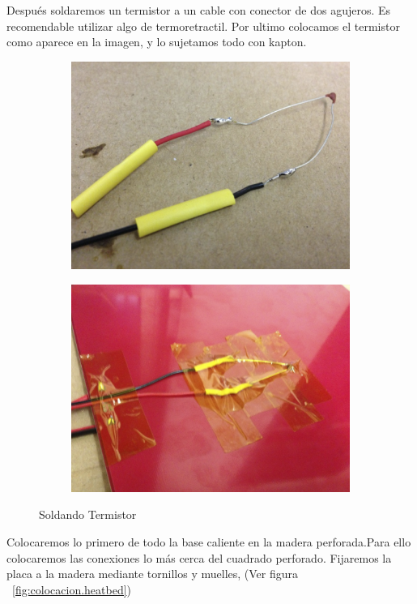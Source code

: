 	Después soldaremos un termistor a un cable con conector de dos agujeros. Es recomendable utilizar algo de termoretractil. Por ultimo colocamos el termistor como aparece en la imagen, y lo sujetamos todo con kapton.
	\begin{figure}[H]
	    \centering
	    \begin{subfigure}[b]{0.4\textwidth}
	        \centering
	        \includegraphics[width=\textwidth]{../../Fotos/36d.jpg}
	    \end{subfigure}
	    \begin{subfigure}[b]{0.4\textwidth}
	       \centering
	       \includegraphics[width=\textwidth]{../../Fotos/36e.jpg}
	       
	    \end{subfigure}
	    \caption{Soldando Termistor}\label{fig:2.y}
	\end{figure}
	Colocaremos lo primero de todo la base caliente en la madera perforada.Para ello colocaremos las conexiones lo más cerca del cuadrado perforado. Fijaremos la placa a la madera mediante tornillos y muelles, (Ver figura ~\ref{fig:colocacion.heatbed})\\

